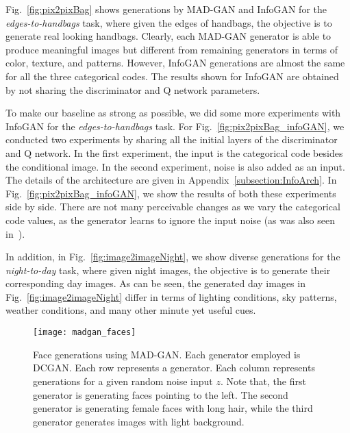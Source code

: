 Fig.~\ref{fig:pix2pixBag} shows generations by MAD-GAN and InfoGAN for the {\em edges-to-handbags} task, where given the edges of handbags, the objective is to generate real looking handbags. Clearly, each MAD-GAN generator is able to produce meaningful images but different from remaining generators in terms of color, texture, and patterns. However, InfoGAN generations are almost the same for all the three categorical codes. The results shown for InfoGAN are obtained by not sharing the discriminator and Q network parameters.

To make our baseline as strong as possible, we did some more experiments with InfoGAN for the {\em edges-to-handbags} task. For Fig.~\ref{fig:pix2pixBag_infoGAN}, we conducted two experiments by sharing all the initial layers of the discriminator and Q network. In the first experiment, the input is the categorical code besides the conditional image. In the second experiment, noise is also added as an input. The details of the architecture are given in Appendix~\ref{subsection:InfoArch}. In Fig.~\ref{fig:pix2pixBag_infoGAN}, we show the results of both these experiments side by side. There are not many perceivable changes as we vary the categorical code values, as the generator learns to ignore the input noise (as was also seen in~\cite{isola2016image2image}).

In addition, in Fig.~\ref{fig:image2imageNight}, we show diverse generations for the {\em night-to-day} task, where given night images, the objective is to generate their corresponding day images. As can be seen, the generated day images in Fig.~\ref{fig:image2imageNight} differ in terms of lighting conditions, sky patterns, weather conditions, and many other minute yet useful cues. 


\newcommand{\addSubFigDCGAN}[3]{\begin{subfigure}[t]{.7\linewidth}
		\texttt{[image: \#1]}
		\caption{#2}\label{#3}\end{subfigure}
}
\begin{figure}
	\centering
	\texttt{[image: madgan\_faces]}
	\caption{Face generations using MAD-GAN. Each generator employed is DCGAN. Each row represents a generator. Each column represents generations for a given random noise input $z$. Note that, the first generator is generating faces pointing to the left. The second generator is generating female faces with long hair, while the third generator generates images with light background. 
	}
	\label{fig:DCGANfaces}
	\vspace{-4mm}
\end{figure}


